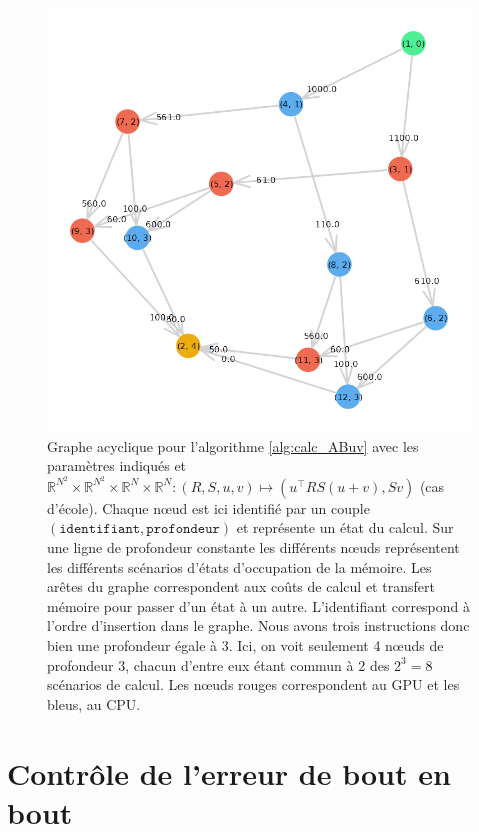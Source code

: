 \documentclass[svgnames,dvipsnames,a4paper,10pt,french]{report}
\begin{document}
\begin{appendices}
\begin{figure}[H]
    \centering
    \includegraphics[width=.7\textwidth]{images/graph_computation.png}
    \caption[Graphe des trajectoires de calcul pour l'algorihme \ref{alg:calc_ABuv}]{Graphe acyclique pour l'algorithme \ref{alg:calc_ABuv} avec les paramètres indiqués et  $\mathbb{R}^{N^2} \times \mathbb{R}^{N^2} \times \mathbb{R}^N \times \mathbb{R}^N: (R, S, u, v) \mapsto (u^\intercal RS(u+v), Sv)$ (cas d'école). Chaque n\oe{}ud est ici identifié par un couple $(\texttt{identifiant}, \texttt{profondeur})$ et représente un état du calcul. Sur une ligne de profondeur constante les différents n\oe{}uds représentent les différents scénarios d'états d'occupation de la mémoire. Les arêtes du graphe correspondent aux coûts de calcul et transfert mémoire pour passer d'un état à un autre. L'identifiant correspond à l'ordre d'insertion dans le graphe. Nous avons trois instructions donc bien une profondeur égale à 3. Ici, on voit seulement 4 n\oe{}uds de profondeur 3, chacun d'entre eux étant commun à 2 des $2^3=8$ scénarios  de calcul. Les n\oe{}uds rouges correspondent au GPU et les bleus, au CPU.}
    \label{fig:graph_computation}
\end{figure}





\section{Contrôle de l'erreur de bout en bout}




\end{appendices}
\end{document}
